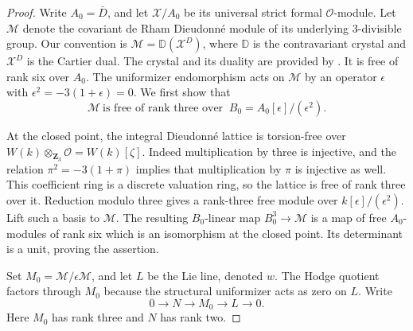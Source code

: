 \documentclass[11pt]{article}
\theoremstyle{definition}
\theoremstyle{remark}
\numberwithin{equation}{section}
\begin{document}
\begin{proof}
Write \(A_0=\bar D\), and let \(\mathcal X/A_0\) be its universal
strict formal \(\mathcal O\)-module.
Let \(\mathcal M\) denote the covariant de Rham Dieudonn\'e module
of its underlying \(3\)-divisible group.  Our convention is
\(\mathcal M=\mathbb D(\mathcal X^D)\), where \(\mathbb D\) is the
contravariant crystal and \(\mathcal X^D\) is the Cartier dual.
The crystal and its duality are provided by
\cite[Section~2.2, Theorem~2, and Section~5.2, Theorem~5(i)]{BerthelotMessing}.
It is free of rank six
over \(A_0\).  The uniformizer endomorphism acts on \(\mathcal M\)
by an operator \(\epsilon\) with
\(\epsilon^2=-3(1+\epsilon)=0\).
We first show that
\[
 \mathcal M\ \text{is free of rank three over }\
 B_0=A_0[\epsilon]/(\epsilon^2).
\]

At the closed point, the integral Dieudonn\'e lattice is
torsion-free over \(W(k)\otimes_{\mathbf Z_3}\mathcal O=W(k)[\zeta]\).
Indeed multiplication by three is injective, and the relation
\(\pi^2=-3(1+\pi)\) implies that multiplication by \(\pi\) is
injective as well.  This coefficient ring is a discrete valuation
ring, so the lattice is free of rank three over it.
Reduction modulo three gives a rank-three free module over
\(k[\epsilon]/(\epsilon^2)\).
Lift such a basis to \(\mathcal M\).  The resulting
\(B_0\)-linear map \(B_0^3\to\mathcal M\) is a map of free
\(A_0\)-modules of rank six which is an isomorphism at the closed
point.  Its determinant is a unit, proving the assertion.

Set \(M_0=\mathcal M/\epsilon\mathcal M\), and let \(L\) be the Lie
line, denoted \(w\).  The Hodge quotient factors through \(M_0\)
because the structural uniformizer acts as zero on \(L\).
Write
\begin{equation}\label{coef:hodge-quotient}
 0\longrightarrow N\longrightarrow M_0\longrightarrow L
       \longrightarrow0.
\end{equation}
Here \(M_0\) has rank three and \(N\) has rank two.


\end{proof}
\end{document}
